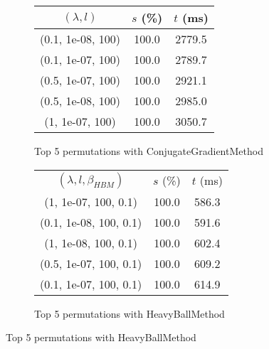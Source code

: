 \begin{figure}[H]
\begin{subfigure}[ht]{.5\textwidth}
\begin{tabular}{|c|c|c|}
\hline
\rowcolor{gray!25}
$(\lambda,l)$ & $s$ (\%) & $t$ (ms) \\
\hline
(0.1, 1e-08, 100) & 100.0 & 2779.5 \\
(0.1, 1e-07, 100) & 100.0 & 2789.7 \\
(0.5, 1e-07, 100) & 100.0 & 2921.1 \\
(0.5, 1e-08, 100) & 100.0 & 2985.0 \\
(1, 1e-07, 100) & 100.0 & 3050.7 \\
\hline
\end{tabular}
\caption{Top 5 permutations with ConjugateGradientMethod}
\label{subfig:param_comp_NegativeEntropy_ConjugateGradientMethod_NewtonsSearch}
\end{subfigure}
\hfill
\begin{subfigure}[ht]{.5\textwidth}
\begin{tabular}{|c|c|c|}
\hline
\rowcolor{gray!25}
\multicolumn{3}{|c|}{HeavyBallMethod} \\
\hline
\rowcolor{gray!25}
$(\lambda,l,\beta_{HBM})$ & $s$ (\%) & $t$ (ms) \\
\hline
(1, 1e-07, 100, 0.1) & 100.0 & 586.3 \\
(0.1, 1e-08, 100, 0.1) & 100.0 & 591.6 \\
(1, 1e-08, 100, 0.1) & 100.0 & 602.4 \\
(0.5, 1e-07, 100, 0.1) & 100.0 & 609.2 \\
(0.1, 1e-07, 100, 0.1) & 100.0 & 614.9 \\
\hline
\end{tabular}
\caption{Top 5 permutations with HeavyBallMethod}
\label{subfig:param_comp_NegativeEntropy_HeavyBallMethod_NewtonsSearch}
\end{subfigure}
\end{figure}
